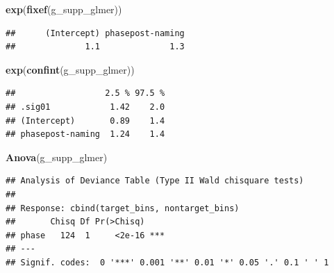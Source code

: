 \documentclass[
  doc,floatsintext]{apa6}
\newenvironment{Shaded}{\begin{snugshade}}{\end{snugshade}}
\newcommand{\FunctionTok}[1]{\textcolor[rgb]{0.13,0.29,0.53}{\textbf{#1}}}
\newcommand{\NormalTok}[1]{#1}
\begin{document}
\begin{Shaded}
\begin{Highlighting}[]
\FunctionTok{exp}\NormalTok{(}\FunctionTok{fixef}\NormalTok{(g\_supp\_glmer))}
\end{Highlighting}
\end{Shaded}

\begin{verbatim}
##      (Intercept) phasepost-naming 
##              1.1              1.3
\end{verbatim}

\begin{Shaded}
\begin{Highlighting}[]
\FunctionTok{exp}\NormalTok{(}\FunctionTok{confint}\NormalTok{(g\_supp\_glmer))}
\end{Highlighting}
\end{Shaded}

\begin{verbatim}
##                  2.5 % 97.5 %
## .sig01            1.42    2.0
## (Intercept)       0.89    1.4
## phasepost-naming  1.24    1.4
\end{verbatim}

\begin{Shaded}
\begin{Highlighting}[]
\FunctionTok{Anova}\NormalTok{(g\_supp\_glmer)}
\end{Highlighting}
\end{Shaded}

\begin{verbatim}
## Analysis of Deviance Table (Type II Wald chisquare tests)
## 
## Response: cbind(target_bins, nontarget_bins)
##       Chisq Df Pr(>Chisq)    
## phase   124  1     <2e-16 ***
## ---
## Signif. codes:  0 '***' 0.001 '**' 0.01 '*' 0.05 '.' 0.1 ' ' 1
\end{verbatim}
\end{document}
